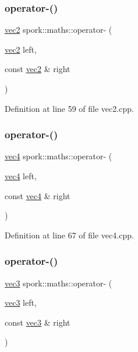\subsubsection{\texorpdfstring{operator-\/()}{operator-()}\hspace{0.1cm}{\footnotesize\ttfamily [1/5]}}
{\footnotesize\ttfamily \hyperlink{structspork_1_1maths_1_1vec2}{vec2} spork\+::maths\+::operator-\/ (\begin{DoxyParamCaption}\item[{\hyperlink{structspork_1_1maths_1_1vec2}{vec2}}]{left,  }\item[{const \hyperlink{structspork_1_1maths_1_1vec2}{vec2} \&}]{right }\end{DoxyParamCaption})}



Definition at line 59 of file vec2.\+cpp.

\mbox{\label{namespacespork_1_1maths_a6bde3edda69efd684ea41488335b6e30}} 
\subsubsection{\texorpdfstring{operator-\/()}{operator-()}\hspace{0.1cm}{\footnotesize\ttfamily [2/5]}}
{\footnotesize\ttfamily \hyperlink{structspork_1_1maths_1_1vec4}{vec4} spork\+::maths\+::operator-\/ (\begin{DoxyParamCaption}\item[{\hyperlink{structspork_1_1maths_1_1vec4}{vec4}}]{left,  }\item[{const \hyperlink{structspork_1_1maths_1_1vec4}{vec4} \&}]{right }\end{DoxyParamCaption})}



Definition at line 67 of file vec4.\+cpp.

\mbox{\label{namespacespork_1_1maths_ac0ee0df63a5845ab9b5e548234b34628}} 
\subsubsection{\texorpdfstring{operator-\/()}{operator-()}\hspace{0.1cm}{\footnotesize\ttfamily [3/5]}}
{\footnotesize\ttfamily \hyperlink{structspork_1_1maths_1_1vec3}{vec3} spork\+::maths\+::operator-\/ (\begin{DoxyParamCaption}\item[{\hyperlink{structspork_1_1maths_1_1vec3}{vec3}}]{left,  }\item[{const \hyperlink{structspork_1_1maths_1_1vec3}{vec3} \&}]{right }\end{DoxyParamCaption})}



